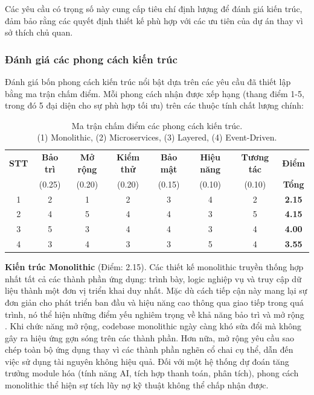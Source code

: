 Các yêu cầu có trọng số này cung cấp tiêu chí định lượng để đánh giá kiến trúc, đảm bảo rằng các quyết định thiết kế phù hợp với các ưu tiên của dự án thay vì sở thích chủ quan.

\subsubsection{Đánh giá các phong cách kiến trúc}

Đánh giá bốn phong cách kiến trúc nổi bật dựa trên các yêu cầu đã thiết lập bằng ma trận chấm điểm. Mỗi phong cách nhận được xếp hạng (thang điểm 1-5, trong đó 5 đại diện cho sự phù hợp tối ưu) trên các thuộc tính chất lượng chính:

\begin{table}[h]
\centering
\caption{Ma trận chấm điểm các phong cách kiến trúc.\\ \small{ (1) Monolithic, (2) Microservices, (3) Layered, (4) Event-Driven.}}
\small
\begin{tabular}{|c|c|c|c|c|c|c|c|}
\hline
\textbf{STT} & \textbf{Bảo trì} & \textbf{Mở rộng} & \textbf{Kiểm thử} & 
\textbf{Bảo mật} & \textbf{Hiệu năng} & \textbf{Tương tác} & \textbf{Điểm} \\
 & (0.25) & (0.20) & (0.20) & (0.15) & (0.10) & (0.10) & \textbf{Tổng} \\
\hline
1 & 2 & 1 & 2 & 3 & 4 & 2 & \textbf{2.15} \\
\hline
2 & 4 & 5 & 4 & 4 & 3 & 5 & \textbf{4.15} \\
\hline
3 & 5 & 3 & 4 & 4 & 3 & 4 & \textbf{4.00} \\
\hline
4 & 3 & 4 & 3 & 3 & 5 & 4 & \textbf{3.55} \\
\hline
\end{tabular}
\end{table}


\textbf{Kiến trúc Monolithic} (Điểm: 2.15). Các thiết kế monolithic truyền thống hợp nhất tất cả các thành phần ứng dụng: trình bày, logic nghiệp vụ và truy cập dữ liệu thành một đơn vị triển khai duy nhất. Mặc dù cách tiếp cận này mang lại sự đơn giản cho phát triển ban đầu và hiệu năng cao thông qua giao tiếp trong quá trình, nó thể hiện những điểm yếu nghiêm trọng về khả năng bảo trì và mở rộng \cite{newman2021}. Khi chức năng mở rộng, codebase monolithic ngày càng khó sửa đổi mà không gây ra hiệu ứng gợn sóng trên các thành phần. Hơn nữa, mở rộng yêu cầu sao chép toàn bộ ứng dụng thay vì các thành phần nghẽn cổ chai cụ thể, dẫn đến việc sử dụng tài nguyên không hiệu quả. Đối với một hệ thống dự đoán tăng trưởng module hóa (tính năng AI, tích hợp thanh toán, phân tích), phong cách monolithic thể hiện sự tích lũy nợ kỹ thuật không thể chấp nhận được.

